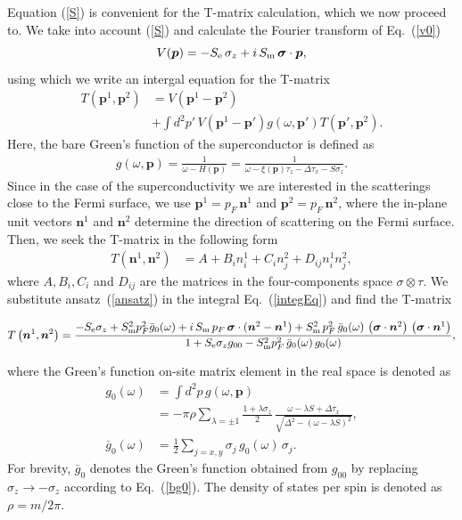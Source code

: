 \documentclass[twocolumn,showpacs,floatfix,nofootinbib,longbibliography]{revtex4-1}
\begin{document}
Equation  (\ref{S}) is convenient for the T-matrix calculation, which we now proceed to. We take into account (\ref{S}) and calculate the Fourier transform of Eq.~(\ref{v0})  
\begin{equation}
	V(\bm p) = -S_{\rm e}\,\sigma_z +  i \,S_{\rm m} \, \bm \sigma\cdot \bm  p,
	\label{vp}
\end{equation}
using which we write an intergal equation for the T-matrix
\begin{align}
	T\left(\bm p^{1},\bm p^{2}\right) &= V \left(\bm p^{1}-\bm p^{2}\right) \nonumber \\
	& +\int d^2 p'\, V\left(\bm p^{1}-\bm p'\right) g(\omega,\bm p')  T\left(\bm p',\bm p^{2}\right).
	\label{integEq}
\end{align}
Here, the bare Green's function of the superconductor is defined as 
\begin{align}
	g(\omega,\bm p) = \frac{1}{\omega-H(\bm p)} = \frac{1}{\omega-\xi(\bm p)\tau_z-\Delta \tau_x - S\sigma_z}.
\end{align}
Since in the case of the superconductivity we are interested in the scatterings close to the Fermi surface, we use $\bm p^{1} = p_F\, \bm n^{1}$ and $\bm p^{2} = p_F \,\bm n^{2}$, where the in-plane unit vectors $\bm n^{1}$ and $\bm n^{2}$ determine the direction of scattering on the Fermi surface.  Then, we seek the T-matrix in the following form
\begin{align}
	T\left(\bm n^{1},\bm n^{2}\right) &= A + B_i n^{1}_i + C_i n^{2}_j + D_{ij} n^{1}_i n^{2}_j, \label{ansatz}
\end{align}
where  $A,B_i,C_i$ and $D_{ij}$ are the matrices in the four-components space $\sigma\otimes\tau$. We substitute ansatz~(\ref{ansatz}) in the integral Eq.~(\ref{integEq}) and find the T-matrix
\begin{widetext}
\begin{equation}
	T\left(\bm n^{1},\bm n^{2}\right) = \frac{-S_{\rm e}\sigma_z+S^2_{\rm m}p_F^2\bar g_{0}(\omega)+i\,S_{\rm m}\,p_F \,  \bm \sigma\cdot(\bm n^{2}- \bm n^{1}) +S^2_{\rm m}\, p^2_F \, \bar g_{0}(\omega)\,\left(\bm \sigma\cdot\bm n^{2}\right)\,\left(\bm \sigma\cdot \bm n^{1}\right)}{1+S_{\rm e}\sigma_zg_{00}-S^2_{\rm m}p_F^2\,\bar g_{0}(\omega)\, g_{0}(\omega)},
\end{equation}
\end{widetext}
where the Green's function on-site matrix element in the real space is denoted as 
\begin{align}
	g_{0}(\omega) &   =\int d^2 p\, g(\omega,\bm p)  	\label{g0} \\
	 & =-\pi\rho\sum_{\lambda = \pm 1} \frac{1+\lambda\sigma_z}{2}\,\frac{\omega-\lambda S+\Delta\tau_x}{\sqrt{\Delta^2-\left( \omega-\lambda S \right)^2}}, \nonumber \\
	 \bar g_{0}(\omega) & = \frac{1}{2} \sum_{j=x,y}\sigma_j\, g_{0}(\omega)\, \sigma_j.\label{bg0}
\end{align}
For brevity, $\bar g_{0}$ denotes the Green's function obtained from $g_{00}$ by replacing $\sigma_z \rightarrow - \sigma_z$ according to Eq.~(\ref{bg0}). The density of states per spin is denoted as $\rho = m/2\pi$.
\end{document}
